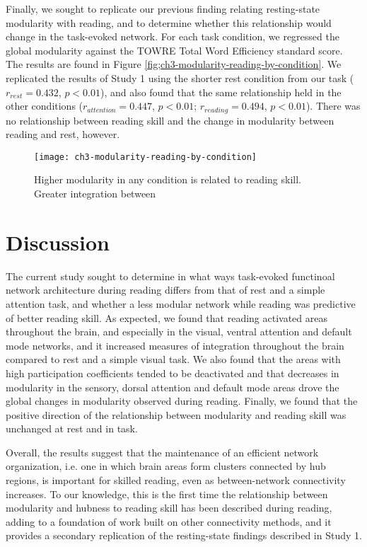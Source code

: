 Finally, we sought to replicate our previous finding relating resting-state modularity with reading, and to determine whether this relationship would change in the task-evoked network. For each task condition, we regressed the global modularity against the TOWRE Total Word Efficiency standard score. The results are found in Figure \ref{fig;ch3-modularity-reading-by-condition}. We replicated the results of Study 1 using the shorter rest condition from our task ($r_{rest} = 0.432$, $p < 0.01$), and also found that the same relationship  held in the other conditions ($r_{attention} = 0.447$, $p < 0.01$; $r_{reading} = 0.494$, $p < 0.01$). There was no relationship between reading skill and the change in modularity between reading and rest, however.  

\begin{figure}[t]
	\centering
	\texttt{[image: ch3-modularity-reading-by-condition]}
    \caption[Higher modularity in any condition is related to reading skill.]{Higher modularity in any condition is related to reading skill. Greater integration between}
	\label{fig:ch3-modularity-reading-by-condition}
\end{figure}


\section{Discussion}

The current study sought to determine in what ways task-evoked functinoal network architecture during reading differs from that of rest and a simple attention task, and whether a less modular network while reading was predictive of better reading skill. As expected, we found that reading activated areas throughout the brain, and especially in the visual, ventral attention and default mode networks, and it increased measures of integration throughout the brain compared to rest and a simple visual task. We also found that the areas with high participation coefficients tended to be deactivated  and that decreases in modularity in the sensory, dorsal attention and default mode areas drove the global changes in modularity observed during reading. Finally, we found that the positive direction of the relationship between modularity and reading skill was unchanged at rest and in task.

Overall, the results suggest that the maintenance of an efficient network organization, i.e. one in which brain areas form clusters connected by hub regions, is important for skilled reading, even as between-network connectivity increases. To our knowledge, this is the first time the relationship between modularity and hubness to reading skill has been described during reading, adding to a foundation of work built on other connectivity methods, and it provides a secondary replication of the resting-state findings described in Study 1.

